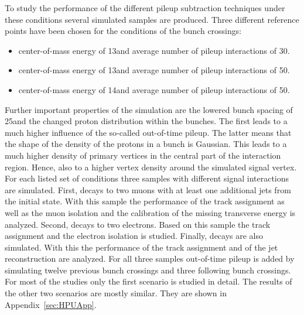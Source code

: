 To study the performance of the different pileup subtraction techniques under these conditions several simulated samples are produced. Three different reference points have been chosen for the conditions of the bunch crossings:
\begin{itemize}
\item center-of-mass energy of 13\TeV and average number of pileup interactions of 30.
\item center-of-mass energy of 13\TeV and average number of pileup interactions of 50.
\item center-of-mass energy of 14\TeV and average number of pileup interactions of 50.
\end{itemize}
Further important properties of the simulation are the lowered bunch spacing of 25\ns and the changed proton distribution within the bunches. The first leads to a much higher influence of the so-called out-of-time pileup. The latter means that the shape of the density of the protons in a bunch is Gaussian. This leads to a much higher density of primary vertices in the central part of the interaction region. Hence, also to a higher vertex density around the simulated signal vertex. \\
For each listed set of conditions three samples with different signal interactions are simulated. First, \Zz decays to two muons with at least one additional jets from the initial state. With this sample the performance of the track assignment as well as the muon isolation and the calibration of the missing transverse energy \ETmiss is analyzed. Second, \Zz decays to two electrons. Based on this sample the track assignment and the electron isolation is studied. Finally, \ttbar decays are also simulated. With this the performance of the track assignment and of the jet reconstruction are analyzed. For all three samples out-of-time pileup is added by simulating twelve previous bunch crossings and three following bunch crossings. For most of the studies only the first scenario is studied in detail. The results of the other two scenarios are mostly similar. They are shown in Appendix~\ref{sec:HPUApp}.

